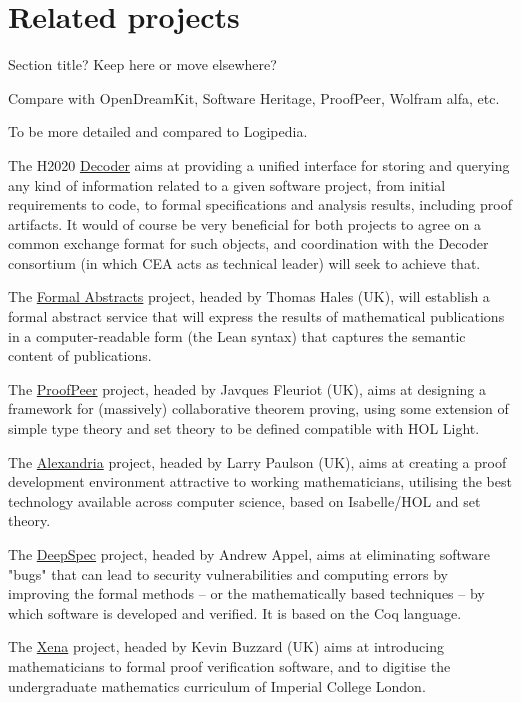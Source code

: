 \section{Related projects}

Section title? Keep here or move elsewhere?

{\color{red} Compare with OpenDreamKit, Software Heritage, ProofPeer,
  Wolfram alfa, etc.}

{\color{red} To be more detailed and compared to Logipedia.}

The H2020 \href{https://www.decoder-project.eu}{Decoder} aims at
providing a unified interface for storing and querying any kind of
information related to a given software project, from initial
requirements to code, to formal specifications and analysis results,
including proof artifacts. It would of course be very beneficial for
both projects to agree on a common exchange format for such objects, and
coordination with the Decoder consortium (in which CEA acts as technical
leader) will seek to achieve that.

The \href{https://formalabstracts.github.io/}{Formal Abstracts}
project, headed by Thomas Hales (UK), will establish a formal abstract
service that will express the results of mathematical publications in
a computer-readable form (the Lean syntax) that captures the semantic
content of publications.

The \href{http://www.proofpeer.net/}{ProofPeer} project, headed by
Javques Fleuriot (UK), aims at designing a framework for (massively)
collaborative theorem proving, using some extension of simple type
theory and set theory to be defined compatible with HOL Light.

The
\href{https://www.cl.cam.ac.uk/~lp15/Grants/Alexandria/}{Alexandria}
project, headed by Larry Paulson (UK), aims at creating a proof
development environment attractive to working mathematicians,
utilising the best technology available across computer science, based
on Isabelle/HOL and set theory.

The \href{https://deepspec.org/}{DeepSpec} project, headed by Andrew
Appel, aims at eliminating software "bugs" that can lead to security
vulnerabilities and computing errors by improving the formal methods
-- or the mathematically based techniques -- by which software is
developed and verified. It is based on the Coq language.

The \href{https://xenaproject.wordpress.com/}{Xena} project, headed by
Kevin Buzzard (UK) aims at introducing mathematicians to formal proof
verification software, and to digitise the undergraduate mathematics
curriculum of Imperial College London.
